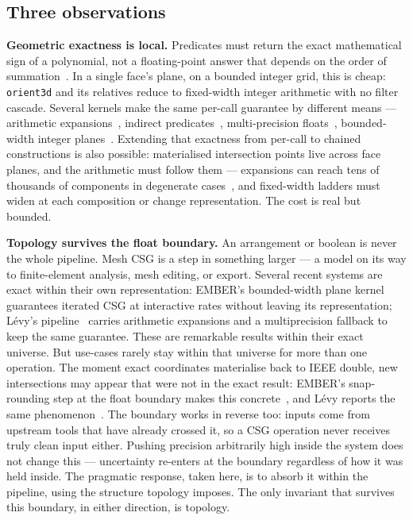 \documentclass{egpubl}
\begin{document}
\subsection{Three observations}
\label{sec:observations}

\textbf{Geometric exactness is local.} Predicates must return the exact mathematical sign of a polynomial, not a floating-point answer that depends on the order of summation~\cite{Levy2025}. In a single face's plane, on a bounded integer grid, this is cheap: \texttt{orient3d} and its relatives reduce to fixed-width integer arithmetic with no filter cascade. Several kernels make the same per-call guarantee by different means --- arithmetic expansions~\cite{Shewchuk1997}, indirect predicates~\cite{Attene2020}, multi-precision floats~\cite{Levy2025}, bounded-width integer planes~\cite{Trettner2022}. Extending that exactness from per-call to chained constructions is also possible: materialised intersection points live across face planes, and the arithmetic must follow them --- expansions can reach tens of thousands of components in degenerate cases~\cite{Levy2025}, and fixed-width ladders must widen at each composition or change representation. The cost is real but bounded.

\textbf{Topology survives the float boundary.} An arrangement or boolean is never the whole pipeline. Mesh CSG is a step in something larger --- a model on its way to finite-element analysis, mesh editing, or export. Several recent systems are exact within their own representation: EMBER's bounded-width plane kernel~\cite{Trettner2022} guarantees iterated CSG at interactive rates without leaving its representation; L\'evy's pipeline~\cite{Levy2025} carries arithmetic expansions and a multiprecision fallback to keep the same guarantee. These are remarkable results within their exact universe. But use-cases rarely stay within that universe for more than one operation. The moment exact coordinates materialise back to IEEE double, new intersections may appear that were not in the exact result: EMBER's snap-rounding step at the float boundary makes this concrete~\cite{Trettner2022}, and L\'evy reports the same phenomenon~\cite{Levy2025}. The boundary works in reverse too: inputs come from upstream tools that have already crossed it, so a CSG operation never receives truly clean input either. Pushing precision arbitrarily high inside the system does not change this --- uncertainty re-enters at the boundary regardless of how it was held inside. The pragmatic response, taken here, is to absorb it within the pipeline, using the structure topology imposes. The only invariant that survives this boundary, in either direction, is topology.
\end{document}
